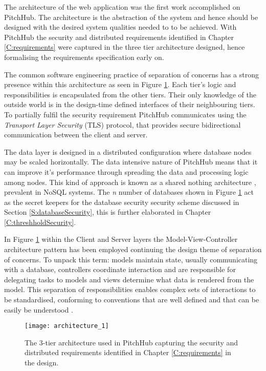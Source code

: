 The architecture of the web application was the first work accomplished on PitchHub. The architecture is the abstraction of the system and hence should be designed with the desired system qualities needed to to be achieved. With PitchHub the security and distributed requirements identified in Chapter \ref{C:requirements} were captured in the three tier architecture designed, hence formalising the requirements specification early on.
\par
The common software engineering practice of separation of concerns has a strong presence within this architecture as seen in Figure \ref{fig:architecture_1}. Each tier's logic and responsibilities is encapsulated from the other tiers. Their only knowledge of the outside world is in the design-time defined interfaces of their neighbouring tiers. To partially fulfil the security requirement PitchHub communicates using the \textit{Transport Layer Security} (TLS) protocol, that provides secure bidirectional communication between the client and server.
\par
The data layer is designed in a distributed configuration where database nodes may be scaled horizontally. The data intensive nature of PitchHub means that it can improve it's performance through spreading the data and processing logic among nodes. This kind of approach is known as a shared nothing architecture \cite{stonebraker1986case}, prevalent in NoSQL systems. The \textit{n} number of databases shown in Figure \ref{fig:architecture_1} act as the secret keepers for the database security security scheme discussed in Section \ref{S:databaseSecurity}, this is further elaborated in Chapter \ref{C:threshholdSecurity}.
\par
In Figure \ref{fig:architecture_1} within the Client and Server layers the Model-View-Controller architecture pattern has been employed continuing the design theme of separation of concerns. To unpack this term: models maintain state, usually communicating with a database, controllers coordinate interaction and are responsible for delegating tasks to models and views determine what data is rendered from the model. This separation of responsibilities enables complex sets of interactions to be standardised, conforming to conventions that are well defined and that can be easily be understood \cite{leff2001web}.

\begin{figure}[ht]
    \centering
    \texttt{[image: architecture\_1]}
    \caption{The 3-tier architecture used in PitchHub capturing the security and distributed requirements identified in Chapter \ref{C:requirements} in the design.}
    \label{fig:architecture_1}
\end{figure}

